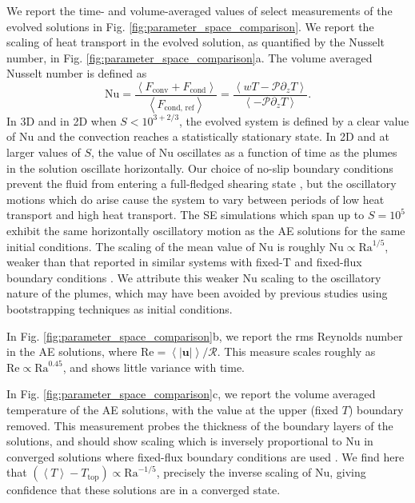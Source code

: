 \documentclass[aps, pre, onecolumn, nofootinbib, notitlepage, groupedaddress, amsfonts, amssymb, amsmath, longbibliography]{revtex4-1}
\newcommand{\angles}[1]{\ensuremath{\left\langle #1 \right\rangle}}
\begin{document}
We report the time- and volume-averaged values of select measurements of the
evolved solutions in Fig. \ref{fig:parameter_space_comparison}.  We report
the scaling of heat transport in the evolved solution, as quantified by the
Nusselt number, in Fig. \ref{fig:parameter_space_comparison}a.
The volume averaged Nusselt number is defined as
\begin{equation}
\text{Nu} = \frac{\angles{F_{\text{conv}} + F_{\text{cond}}}}{\angles{F_{\text{cond, ref}}}}
 = \frac{\angles{wT - \mathcal{P}\partial_z T}}{\angles{- \mathcal{P} \partial_z T}}.
\end{equation}
In 3D and in 2D when $S < 10^{3+2/3}$, the evolved system is defined by a clear
value of Nu and the convection reaches a statistically stationary state.
In 2D and at larger values of $S$, the value of Nu oscillates as a function of time
as the plumes in the solution oscillate horizontally.  Our choice of no-slip
boundary conditions prevent the fluid from entering a full-fledged shearing state
\cite{goluskin&all2014}, but the oscillatory motions which do arise cause the
system to vary between periods of low heat transport and high heat transport.
The SE simulations which span up to $S = 10^5$ exhibit the same horizontally
oscillatory motion as the AE solutions for the same initial conditions. The
scaling of the mean value of Nu is roughly $\text{Nu} \propto \text{Ra}^{1/5}$,
weaker than that reported in similar systems with fixed-T and fixed-flux boundary
conditions \cite{johnston&doering2009}.  We attribute this weaker Nu scaling to
the oscillatory nature of the plumes, which may have been avoided by previous studies
using bootstrapping techniques as initial conditions.

In Fig. \ref{fig:parameter_space_comparison}b, we report the rms Reynolds number
in the AE solutions, where
$\text{Re} = \angles{|\bm{u}|} / \mathcal{R}$.  This measure scales roughly as
$\text{Re} \propto \text{Ra}^{0.45}$, and shows little variance with time.

In Fig. \ref{fig:parameter_space_comparison}c, we report the volume averaged 
temperature of the AE solutions, with the value at the upper (fixed $T$) boundary removed.
This measurement probes the thickness of the boundary layers of the solutions, and
should show scaling which is inversely proportional to Nu in converged solutions
where fixed-flux boundary conditions are used \cite{otero&all2002}.  We find here
that $(\angles{T} - T_{\text{top}}) \propto \text{Ra}^{-1/5}$, precisely the inverse
scaling of Nu, giving confidence that these solutions are in a converged state.
\end{document}

